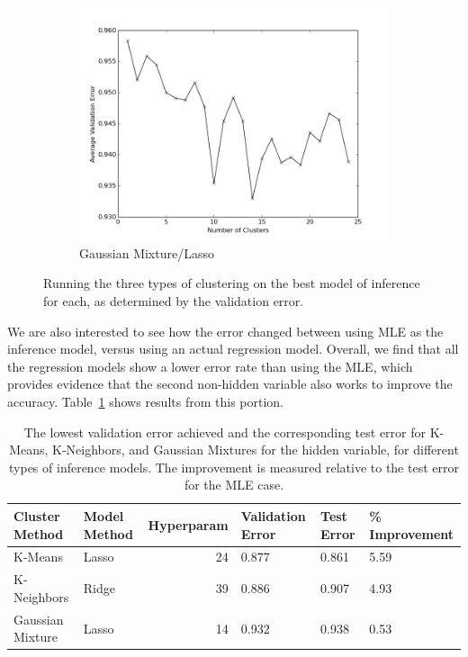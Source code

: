 \documentclass[11pt]{article}
\begin{document}
\begin{figure}[h!]
\begin{subfigure}[h!]{0.33\textwidth}
        \includegraphics[width=\textwidth]{GM_lasso.png}
        \caption{Gaussian Mixture/Lasso}
        \label{fig:gmBEST}
    \end{subfigure}
    \caption{Running the three types of clustering on the best model of inference for each, as determined by the validation error.}
    \label{fig:BEST}
\end{figure}

We are also interested to see how the error changed between using MLE as the inference model, versus using an actual regression model. Overall, we find that all the regression models show a lower error rate than using the MLE, which provides evidence that the second non-hidden variable also works to improve the accuracy. Table~\ref{tab:improvement} shows results from this portion.

\begin{table}[h!]
    \begin{tabularx}{0.9\textwidth}{| l | X | r | X | X | X |}
        \hline
        Cluster Method & Model Method & Hyperparam & Validation Error & Test Error & \% Improvement\\
        \hline
        K-Means & Lasso & 24 & 0.877 & 0.861 & 5.59 \\
        K-Neighbors & Ridge & 39 & 0.886 & 0.907 & 4.93 \\
        Gaussian Mixture & Lasso & 14 & 0.932 & 0.938 & 0.53 \\
        \hline
    \end{tabularx}
    \caption{The lowest validation error achieved and the corresponding test error for K-Means, K-Neighbors, and Gaussian Mixtures for the hidden variable, for different types of inference models. The improvement is measured relative to the test error for the MLE case.}
    \label{tab:improvement}
\end{table}
\end{document}
